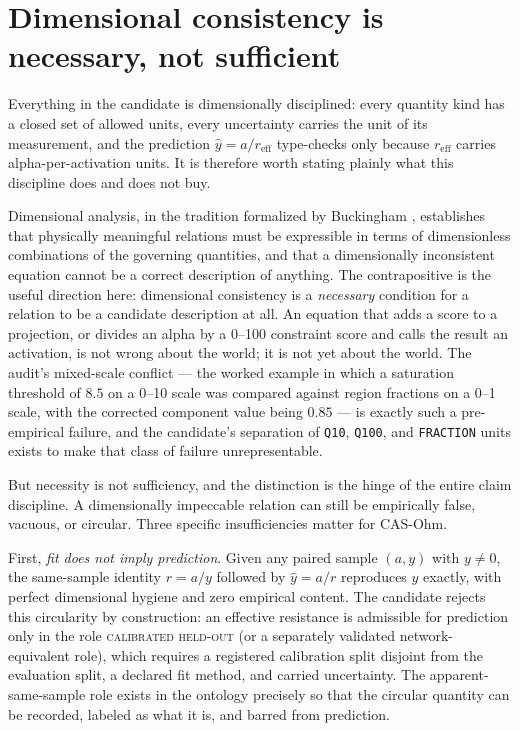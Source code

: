\section{Dimensional consistency is necessary, not sufficient}\label{ch01:dimensional}

Everything in the candidate is dimensionally disciplined: every quantity kind has a closed set of allowed units, every uncertainty carries the unit of its measurement, and the prediction $\hat{y} = a/r_{\mathrm{eff}}$ type-checks only because $r_{\mathrm{eff}}$ carries alpha-per-activation units. It is therefore worth stating plainly what this discipline does and does not buy.

Dimensional analysis, in the tradition formalized by Buckingham \cite{buckingham}, establishes that physically meaningful relations must be expressible in terms of dimensionless combinations of the governing quantities, and that a dimensionally inconsistent equation cannot be a correct description of anything. The contrapositive is the useful direction here: dimensional consistency is a \emph{necessary} condition for a relation to be a candidate description at all. An equation that adds a score to a projection, or divides an alpha by a 0--100 constraint score and calls the result an activation, is not wrong about the world; it is not yet about the world. The audit's mixed-scale conflict --- the worked example in which a saturation threshold of $8.5$ on a 0--10 scale was compared against region fractions on a 0--1 scale, with the corrected component value being $0.85$ --- is exactly such a pre-empirical failure, and the candidate's separation of \texttt{Q10}, \texttt{Q100}, and \texttt{FRACTION} units exists to make that class of failure unrepresentable.

But necessity is not sufficiency, and the distinction is the hinge of the entire claim discipline. A dimensionally impeccable relation can still be empirically false, vacuous, or circular. Three specific insufficiencies matter for CAS-Ohm.

First, \emph{fit does not imply prediction}. Given any paired sample $(a, y)$ with $y \neq 0$, the same-sample identity $r = a/y$ followed by $\hat{y} = a/r$ reproduces $y$ exactly, with perfect dimensional hygiene and zero empirical content. The candidate rejects this circularity by construction: an effective resistance is admissible for prediction only in the role \textsc{calibrated held-out} (or a separately validated network-equivalent role), which requires a registered calibration split disjoint from the evaluation split, a declared fit method, and carried uncertainty. The apparent-same-sample role exists in the ontology precisely so that the circular quantity can be recorded, labeled as what it is, and barred from prediction.

